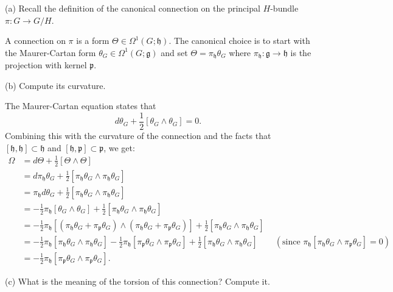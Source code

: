 \documentclass{../../templates/lkx_pset}
\begin{document}
\begin{parts}
	\begin{part}{(a)}
		Recall the definition of the canonical connection on the principal $H$-bundle $\pi : G\to G/H$.
	\end{part}

	A connection on $\pi$ is a form $\Theta \in \Omega^1(G; \mathfrak{h})$. The canonical choice is to start with the Maurer-Cartan form $\theta_G\in \Omega^1(G; \mathfrak{g})$ and set $\Theta =\pi_\mathfrak{h} \theta_G$ where $\pi_\mathfrak{h} : \mathfrak{g} \to \mathfrak{h}$ is the projection with kernel $\mathfrak{p}$.

	\begin{part}{(b)}
		Compute its curvature.
	\end{part}
	The Maurer-Cartan equation states that
	\[
    d\theta_G + \frac{1}{2}[\theta_G\wedge\theta_G]=0.
	\]
  Combining this with the curvature of the connection and the facts that $[\mathfrak{h},\mathfrak{h}]\subset \mathfrak{h}$ and $[\mathfrak{h},\mathfrak{p}]\subset\mathfrak{p}$, we get:
  \[
    \begin{aligned}
      \Omega 
      &= d\Theta + \frac{1}{2}[\Theta\wedge\Theta]\\
      &= d\pi_\mathfrak{h}\theta_G + \frac{1}{2}[\pi_\mathfrak{h}\theta_G\wedge \pi_\mathfrak{h}\theta_G]\\
      &= \pi_\mathfrak{h}d\theta_G + \frac{1}{2}[\pi_\mathfrak{h}\theta_G\wedge \pi_\mathfrak{h}\theta_G]\\
      &= -\frac{1}{2}\pi_\mathfrak{h}[\theta_G\wedge\theta_G] + \frac{1}{2}[\pi_\mathfrak{h}\theta_G\wedge \pi_\mathfrak{h}\theta_G]\\
      &= -\frac{1}{2}\pi_\mathfrak{h}[
      (\pi_\mathfrak{h}\theta_G + \pi_\mathfrak{p}\theta_G)\wedge(\pi_\mathfrak{h}\theta_G + \pi_\mathfrak{p}\theta_G)
    ] + \frac{1}{2}[\pi_\mathfrak{h}\theta_G\wedge \pi_\mathfrak{h}\theta_G]\\
      &= -\frac{1}{2}\pi_{\mathfrak{h}}[\pi_{\mathfrak{h}} \theta_G \wedge \pi_{\mathfrak{h}}\theta_G]
         -\frac{1}{2}\pi_{\mathfrak{h}}[\pi_{\mathfrak{p}} \theta_G \wedge \pi_{\mathfrak{p}}\theta_G]
         +\frac{1}{2}[\pi_{\mathfrak{h}} \theta_G \wedge \pi_{\mathfrak{h}}\theta_G]\quad\quad(\textrm{since } \pi_\mathfrak{h} [\pi_\mathfrak{h}\theta_G\wedge \pi_\mathfrak{p}\theta_G]=0)\\
      &= -\frac{1}{2}\pi_{\mathfrak{h}}[\pi_{\mathfrak{p}} \theta_G \wedge \pi_{\mathfrak{p}}\theta_G].
    \end{aligned}
  \]
	\begin{part}{(c)}
		What is the meaning of the torsion of this connection? Compute it.
	\end{part}


\end{parts}
\end{document}
